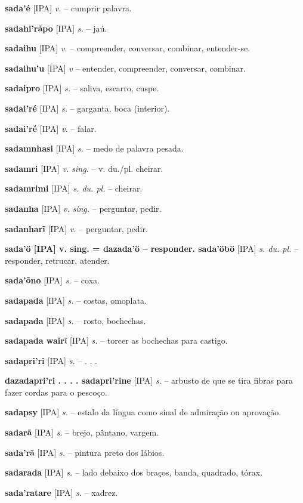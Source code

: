 {\textbf{sada'é} [IPA] \textit{v.} -- cumprir palavra.

\textbf{sadahi'rãpo} [IPA] \textit{s.} -- jaú.

\textbf{sadaihu} [IPA] \textit{v.} -- compreender, conversar, combinar, entender-se.

\textbf{sadaihu'u} [IPA] \textit{v} -- entender, compreender, conversar, combinar.

\textbf{sadaipro} [IPA] \textit{s.} -- saliva, escarro, cuspe.

\textbf{sadai'ré} [IPA] \textit{s.} -- garganta, boca (interior).

\textbf{sadai'ré} [IPA] \textit{v.} -- falar.

\textbf{sadamnhasi} [IPA] \textit{s.} -- medo de palavra pesada.

\textbf{sadamri} [IPA] \textit{v. sing.} -- v. du./pl. cheirar.

\textbf{sadamrimi} [IPA] \textit{s. du. pl.} -- cheirar.

\textbf{sadanha} [IPA] \textit{v. sing.} -- perguntar, pedir.

\textbf{sadanharĩ} [IPA] \textit{v.} -- perguntar, pedir.

\textbf{sada'ö [IPA] v. sing. = dazada'ö -- responder. sada'öbö} [IPA] \textit{s. du. pl.} -- responder, retrucar, atender.

\textbf{sada'õno} [IPA] \textit{s.} -- coxa.

\textbf{sadapada} [IPA] \textit{s.} -- costas, omoplata.

\textbf{sadapada} [IPA] \textit{s.} -- rosto, bochechas.

\textbf{sadapada wairĩ} [IPA] \textit{s.} -- torcer as bochechas para castigo.

\textbf{sadapri'ri} [IPA] \textit{s.} -- . . .

\textbf{dazadapri'ri . . . . sadapri'rine} [IPA] \textit{s.} -- arbusto de que se tira fibras para fazer cordas para o pescoço.

\textbf{sadapsy} [IPA] \textit{s.} -- estalo da língua como sinal de admiração ou aprovação.

\textbf{sadarã} [IPA] \textit{s.} -- brejo, pântano, vargem.

\textbf{sada'rã} [IPA] \textit{s.} -- pintura preto dos lábios.

\textbf{sadarada} [IPA] \textit{s.} -- lado debaixo dos braços, banda, quadrado, tórax.

\textbf{sada'ratare} [IPA] \textit{s.} -- xadrez.

}
